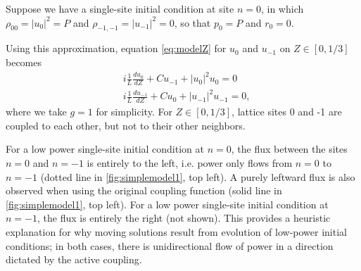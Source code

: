 \documentclass[reprint, amsmath,amssymb,aps,pre]{revtex4-2}
\begin{document}
Suppose we have a single-site initial condition at site $n=0$, in which $\rho_{00} = |u_0|^2 = P$ and $\rho_{-1,-1} = |u_{-1}|^2 = 0$, so that $p_0 = P$ and $r_0 = 0$.   




Using this approximation, equation \cref{eq:modelZ} for $u_0$ and $u_{-1}$ on $Z \in [0,1/3]$ becomes
\begin{equation}\label{eq:approx2}
\begin{aligned}
&i \frac{1}{L} \frac{d u_0}{d Z} + C u_{-1} + |u_0|^2 u_0 = 0 \\
&i \frac{1}{L} \frac{d u_{-1}}{d Z} + C u_{0} + |u_{-1}|^2 u_{-1} = 0,
\end{aligned}
\end{equation}
where we take $g=1$ for simplicity. For $Z \in [0,1/3]$, lattice sites 0 and -1 are coupled to each other, but not to their other neighbors. 

For a low power single-site initial condition at $n=0$, the flux between the sites $n=0$ and $n=-1$ is entirely to the left, i.e. power only flows from $n=0$ to $n=-1$ (dotted line in \cref{fig:simplemodel1}, top left). A purely leftward flux is also observed when using the original coupling function (solid line in \cref{fig:simplemodel1}, top left).
For a low power single-site initial condition at $n=-1$, the flux is entirely the right (not shown).
This provides a heuristic explanation for why moving solutions result from evolution of low-power initial conditions; in both cases, there is unidirectional flow of power in a direction dictated by the active coupling.
\end{document}
